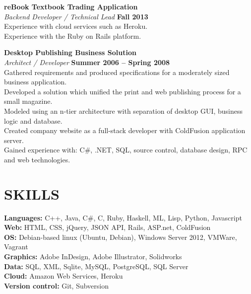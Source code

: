 \documentclass[margin,line]{resume}
\begin{document}
\begin{resume}
    \textbf{\listing reBook Textbook Trading Application} \vspace{2mm}\\\vspace{1mm}%
    \textsl{Backend Developer / Technical Lead} \hfill \textbf{Fall 2013}\\
    Experience with cloud services such as Heroku.\\
    Experience with the Ruby on Rails platform.

    \textbf{\listing Desktop Publishing Business Solution} \vspace{2mm}\\\vspace{1mm}%
    \textsl{Architect / Developer} \hfill \textbf{Summer 2006 -- Spring 2008}\\
    Gathered requirements and produced specifications for a moderately sized business application.\\
    Developed a solution which unified the print and web publishing process for a small magazine.\\
    Modeled using an n-tier architecture with separation of desktop GUI, business logic and database.\\
    Created company website as a full-stack developer with ColdFusion application server.\\
    Gained experience with: C\#, .NET, SQL, source control, database design, RPC and web technologies.
    

\sectionline

    \section{\mysidestyle \textbf{\large{S}\small{KILLS}}}

    \textbf{Languages:} C++, Java, C\#, C, Ruby, Haskell, ML, Lisp, Python, Javascript\\
    \textbf{Web:} HTML, CSS, jQuery, JSON API, Rails, ASP.net, ColdFusion\\
    \textbf{OS:} Debian-based linux (Ubuntu, Debian), Windows Server 2012, VMWare, Vagrant\\
    \textbf{Graphics:} Adobe InDesign, Adobe Illustrator, Solidworks\\
    \textbf{Data:} SQL, XML, Sqlite, MySQL, PostgreSQL, SQL Server\\
    \textbf{Cloud:} Amazon Web Services, Heroku\\
    \textbf{Version control:} Git, Subversion

\end{resume}
\end{document}
